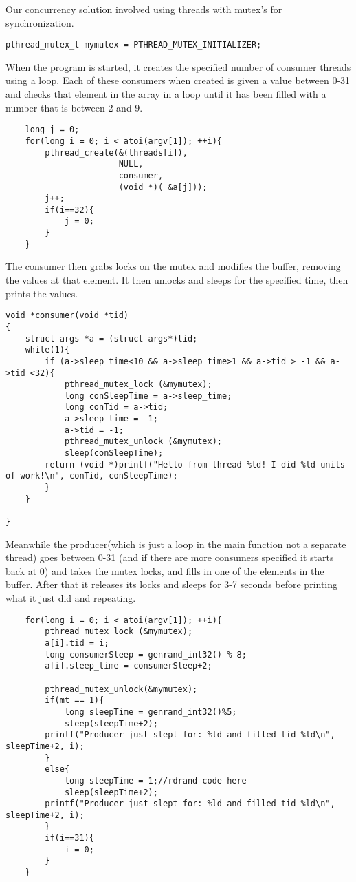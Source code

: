 \documentclass[letterpaper,10pt,titlepage]{article}
\begin{document}
\sloppy Our concurrency solution involved using threads with mutex’s for synchronization. 
\begin{lstlisting}
pthread_mutex_t mymutex = PTHREAD_MUTEX_INITIALIZER;
\end{lstlisting}
When the program is started, it creates the specified number of consumer threads using a loop. Each of these consumers when created is given a value between 0-31 and checks that element in the array in a loop until it has been filled with a number that is between 2 and 9. 
\begin{lstlisting}
	long j = 0;
	for(long i = 0; i < atoi(argv[1]); ++i){
		pthread_create(&(threads[i]),
		               NULL,
		               consumer,
		               (void *)( &a[j]));
		j++;
		if(i==32){
			j = 0;
		}	
	}
\end{lstlisting}
The consumer then grabs locks on the mutex and modifies the buffer, removing the values at that element. It then unlocks and sleeps for the specified time, then prints the values. \begin{lstlisting}
void *consumer(void *tid)
{
	struct args *a = (struct args*)tid;
	while(1){		
		if (a->sleep_time<10 && a->sleep_time>1 && a->tid > -1 && a->tid <32){
			pthread_mutex_lock (&mymutex);
			long conSleepTime = a->sleep_time;
			long conTid = a->tid;
			a->sleep_time = -1;
			a->tid = -1;
			pthread_mutex_unlock (&mymutex);
			sleep(conSleepTime);
		return (void *)printf("Hello from thread %ld! I did %ld units of work!\n", conTid, conSleepTime);
		}
	}

}
\end{lstlisting}
Meanwhile the producer(which is just a loop in the main function not a separate thread) goes between 0-31 (and if there are more consumers specified it starts back at 0) and takes the mutex locks, and fills in one of the elements in the buffer. After that it releases its locks and sleeps for 3-7 seconds before printing what it just did and repeating. 
\begin{lstlisting}
	for(long i = 0; i < atoi(argv[1]); ++i){
		pthread_mutex_lock (&mymutex);
		a[i].tid = i;
 		long consumerSleep = genrand_int32() % 8;
		a[i].sleep_time = consumerSleep+2;

		pthread_mutex_unlock(&mymutex);
		if(mt == 1){
			long sleepTime = genrand_int32()%5;
			sleep(sleepTime+2);
		printf("Producer just slept for: %ld and filled tid %ld\n", sleepTime+2, i);	
		}
		else{
			long sleepTime = 1;//rdrand code here
			sleep(sleepTime+2);
		printf("Producer just slept for: %ld and filled tid %ld\n", sleepTime+2, i);	
		}
		if(i==31){
			i = 0;
		}
	}
\end{lstlisting}
\end{document}
